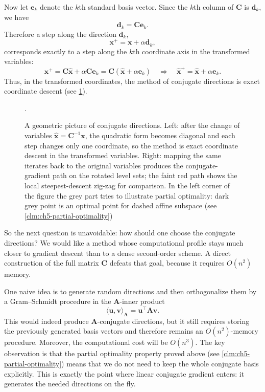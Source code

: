 Now let $\mathbf{e}_k$ denote the $k$th standard basis vector. Since the
$k$th column of $\mathbf{C}$ is $\mathbf{d}_k$, we have
\[
  \mathbf{d}_k=\mathbf{C}\mathbf{e}_k.
\]
Therefore a step along the direction $\mathbf{d}_k$,
\[
  \mathbf{x}^+=\mathbf{x}+\alpha \mathbf{d}_k,
\]
corresponds exactly to a step along the $k$th coordinate axis in the
transformed variables:
\[
  \mathbf{x}^+
  =\mathbf{C}\hat{\mathbf{x}}+\alpha \mathbf{C}\mathbf{e}_k
  =\mathbf{C}(\hat{\mathbf{x}}+\alpha \mathbf{e}_k)
  \quad \Longrightarrow \quad
  \hat{\mathbf{x}}^+=\hat{\mathbf{x}}+\alpha \mathbf{e}_k.
\]
Thus, in the transformed coordinates, the method of conjugate directions is
exact coordinate descent (see \cref{fig:ch5-coordinate-vs-conjugate}).


\begin{figure}[ht]
    \centering
    \caption{A geometric picture of conjugate directions. Left: after the change
  of variables $\hat{\mathbf{x}}=\mathbf{C}^{-1}\mathbf{x}$, the quadratic form
  becomes diagonal and each step changes only one coordinate, so the method is
  exact coordinate descent in the transformed variables. Right: mapping the
  same iterates back to the original variables produces the conjugate-gradient
  path on the rotated level sets; the faint red path shows the local
  steepest-descent zig-zag for comparison. In the left corner of the figure 
the grey part tries to illustrate partial optimality: dark grey point is 
an optimal point for dashed affine subspace 
(see \cref{clm:ch5-partial-optimality})}.
    \label{fig:ch5-coordinate-vs-conjugate}
\end{figure}


So the next question is unavoidable: how should one choose the conjugate
directions? We would like a method whose computational profile stays much
closer to gradient descent than to a dense second-order scheme. A direct
construction of the full matrix $\mathbf{C}$ defeats that goal, because it
requires $O(n^2)$ memory.

One naive idea is to generate random 
directions and then orthogonalize them by a
Gram--Schmidt procedure in the $\mathbf{A}$-inner product
\[
  \langle \mathbf{u},\mathbf{v}\rangle_{\mathbf{A}}
  =\mathbf{u}^{\top}\mathbf{A}\mathbf{v}.
\]
This would indeed produce $\mathbf{A}$-conjugate directions, but it still
requires storing the previously generated basis vectors and therefore remains
an $O(n^2)$-memory procedure. Moreover, the computational cost
will be $O(n^3)$. The key observation is that the partial
optimality property proved above (see \cref{clm:ch5-partial-optimality})
means that we do not need to keep the whole
conjugate basis explicitly. This is exactly the point where linear conjugate
gradient enters: it generates the needed directions on the fly.

